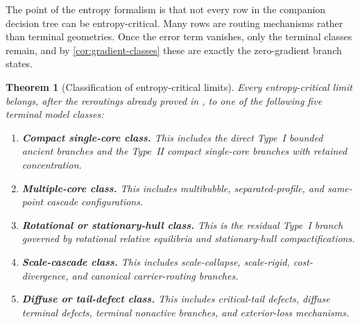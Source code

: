 \documentclass[11pt]{amsart}
\numberwithin{equation}{section}
\theoremstyle{plain}
\newtheorem{theorem}{Theorem}[section]
\theoremstyle{definition}
\theoremstyle{remark}
\begin{document}
The point of the entropy formalism is that not every row in the companion
decision tree can be entropy-critical.  Many rows are routing mechanisms rather
than terminal geometries.  Once the error term vanishes, only the terminal
classes remain, and by \cref{cor:gradient-classes} these are exactly the
zero-gradient branch states.

\begin{theorem}[Classification of entropy-critical limits]
\label{thm:five-classes}
Every entropy-critical limit belongs, after the reroutings already proved in
\cite{BallesterSetup,BallesterResidual,BallesterTypeII}, to one of the
following five terminal model classes:
\begin{enumerate}[label=\textup{(\arabic*)},leftmargin=2.2em]
	\item \textbf{Compact single-core class.}
	This includes the direct Type~I bounded ancient branches and the Type~II
	compact single-core branches with retained concentration.
	\item \textbf{Multiple-core class.}
	This includes multibubble, separated-profile, and same-point cascade
	configurations.
	\item \textbf{Rotational or stationary-hull class.}
	This is the residual Type~I branch governed by rotational relative
	equilibria and stationary-hull compactifications.
	\item \textbf{Scale-cascade class.}
	This includes scale-collapse, scale-rigid, cost-divergence, and canonical
	carrier-routing branches.
	\item \textbf{Diffuse or tail-defect class.}
	This includes critical-tail defects, diffuse terminal defects, terminal
	nonactive branches, and exterior-loss mechanisms.
\end{enumerate}
\end{theorem}
\end{document}
